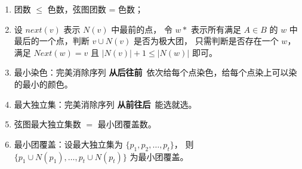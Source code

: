 \begin{enumerate}
	\item 团数 $\leq$ 色数，弦图团数 = 色数；
	
	\item 设 $next(v)$ 表示 $N(v)$ 中最前的点，
	令 $w*$ 表示所有满足 $A \in B$ 的 $w$ 中最后的一个点，判断 $v \cup N(v)$ 是否为极大团，
	只需判断是否存在一个 $w$，满足 $Next(w)=v$ 且 $|N(v)| + 1 \leq |N(w)|$ 即可。
	
	\item 最小染色：完美消除序列 \textbf{从后往前}\ 依次给每个点染色，给每个点染上可以染的最小的颜色。
	
	\item 最大独立集：完美消除序列 \textbf{从前往后}\ 能选就选。
	
	\item 弦图最大独立集数 $=$ 最小团覆盖数。
	
	\item 最小团覆盖：设最大独立集为 $\{p_1,p_2, \dots ,p_t\}$，
	则 $\{p_1\cup N(p_1), \dots , p_t \cup N(p_t)\}$  为最小团覆盖。
\end{enumerate}

